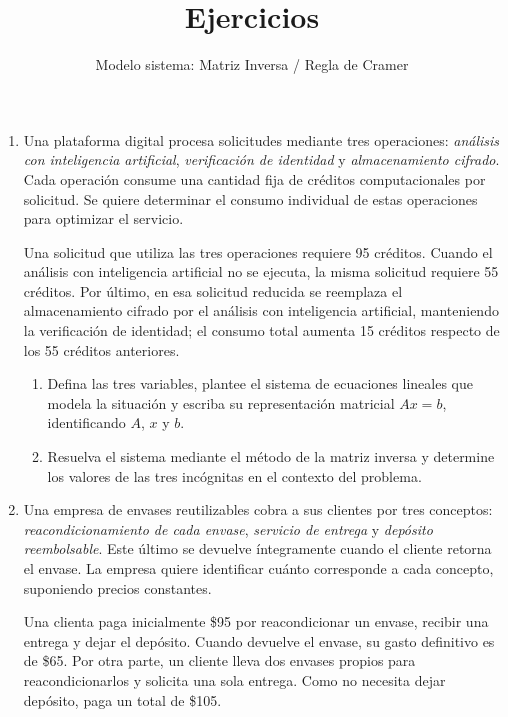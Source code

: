 \documentclass[11pt,a4paper]{article}
\title{\textbf{Ejercicios}}
\author{Modelo sistema: Matriz Inversa / Regla de Cramer}
\date{}
\begin{document}
\maketitle



\begin{enumerate}

\item Una plataforma digital procesa solicitudes mediante tres operaciones: \emph{análisis con inteligencia artificial}, \emph{verificación de identidad} y \emph{almacenamiento cifrado}. Cada operación consume una cantidad fija de créditos computacionales por solicitud. Se quiere determinar el consumo individual de estas operaciones para optimizar el servicio.

Una solicitud que utiliza las tres operaciones requiere {95 créditos}. Cuando el análisis con inteligencia artificial no se ejecuta, la misma solicitud requiere {55 créditos}. Por último, en esa solicitud reducida se reemplaza el almacenamiento cifrado por el análisis con inteligencia artificial, manteniendo la verificación de identidad; el consumo total {aumenta 15 créditos} respecto de los 55 créditos anteriores.




\begin{enumerate}
\item Defina las tres variables, plantee el sistema de ecuaciones lineales que modela la situación y escriba su representación matricial $Ax=b$, identificando $A$, $x$ y $b$.
\item Resuelva el sistema mediante el método de la matriz inversa y determine los valores de las tres incógnitas en el contexto del problema.
\end{enumerate}

\item  Una empresa de envases reutilizables cobra a sus clientes por tres conceptos: \emph{reacondicionamiento de cada envase}, \emph{servicio de entrega} y \emph{depósito reembolsable}. Este último se devuelve íntegramente cuando el cliente retorna el envase. La empresa quiere identificar cuánto corresponde a cada concepto, suponiendo precios constantes.

Una clienta paga inicialmente {\$95} por reacondicionar un envase, recibir una entrega y dejar el depósito. Cuando devuelve el envase, su gasto definitivo es de {\$65}. Por otra parte, un cliente lleva {dos envases propios} para reacondicionarlos y solicita {una sola entrega}. Como no necesita dejar depósito, paga un total de {\$105}.





\end{enumerate}
\end{document}
